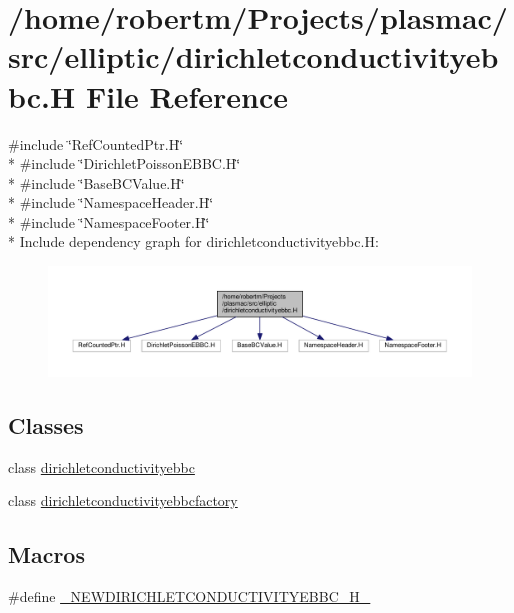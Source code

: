 \hypertarget{dirichletconductivityebbc_8H}{}\section{/home/robertm/\+Projects/plasmac/src/elliptic/dirichletconductivityebbc.H File Reference}
\label{dirichletconductivityebbc_8H}
{\ttfamily \#include \char`\"{}Ref\+Counted\+Ptr.\+H\char`\"{}}\\*
{\ttfamily \#include \char`\"{}Dirichlet\+Poisson\+E\+B\+B\+C.\+H\char`\"{}}\\*
{\ttfamily \#include \char`\"{}Base\+B\+C\+Value.\+H\char`\"{}}\\*
{\ttfamily \#include \char`\"{}Namespace\+Header.\+H\char`\"{}}\\*
{\ttfamily \#include \char`\"{}Namespace\+Footer.\+H\char`\"{}}\\*
Include dependency graph for dirichletconductivityebbc.\+H\+:\nopagebreak
\begin{figure}[H]
\begin{center}
\leavevmode
\includegraphics[width=350pt]{dirichletconductivityebbc_8H__incl}
\end{center}
\end{figure}
\subsection*{Classes}
\begin{DoxyCompactItemize}
\item 
class \hyperlink{classdirichletconductivityebbc}{dirichletconductivityebbc}
\item 
class \hyperlink{classdirichletconductivityebbcfactory}{dirichletconductivityebbcfactory}
\end{DoxyCompactItemize}
\subsection*{Macros}
\begin{DoxyCompactItemize}
\item 
\#define \hyperlink{dirichletconductivityebbc_8H_a8c0c4e766c8481e2c71df6ad981be4d1}{\+\_\+\+N\+E\+W\+D\+I\+R\+I\+C\+H\+L\+E\+T\+C\+O\+N\+D\+U\+C\+T\+I\+V\+I\+T\+Y\+E\+B\+B\+C\+\_\+\+H\+\_\+}
\end{DoxyCompactItemize}


